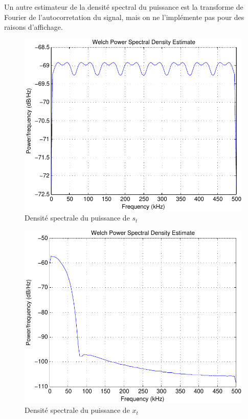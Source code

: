 \documentclass[a4paper,11pt]{article}
\begin{document}
Un autre estimateur de la densité spectral du puissance est la transforme de Fourier de l'autocorretation du signal, mais on ne l'implémente pas pour des raisons d'affichage.

\begin{figure}[htb]
	\begin{center}
	\includegraphics[scale=1]{welch_s_t-crop.pdf}
	\caption{Densité spectrale du puissance de $s_t$}
	\label{fig:ques4_st}
	\end{center}
\end{figure} 

\begin{figure}[htb]
	\begin{center}
	\includegraphics[scale=1]{welch_x_t-crop.pdf}
	\caption{Densité spectrale du puissance de $x_t$}
	\label{fig:ques4_xt}
	\end{center}
\end{figure} 
\end{document}
